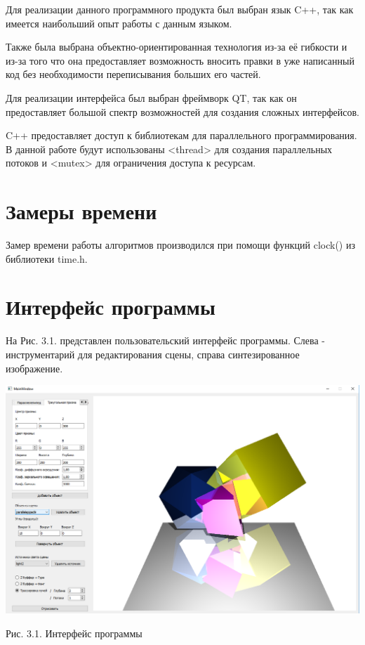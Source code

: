 \documentclass[12pt]{report}
\begin{document}
		Для реализации данного программного продукта был выбран язык C++, так как имеется наибольший опыт работы с данным языком.
		
		Также была выбрана объектно-ориентированная технология из-за её гибкости и из-за того что она предоставляет возможность вносить правки в уже написанный код без необходимости переписывания больших его частей.
		
		Для реализации интерфейса был выбран фреймворк QT, так как он предоставляет большой спектр возможностей для создания сложных интерфейсов.
		
		C++ предоставляет доступ к библиотекам для параллельного программирования. В данной работе будут использованы <thread> для создания параллельных потоков и <mutex> для ограничения доступа к ресурсам.
		
	\section{Замеры времени}
	Замер времени работы алгоритмов производился при помощи функций clock() из библиотеки time.h.
	
	\newpage
	\section{Интерфейс программы}
	
	На Рис. 3.1. представлен пользовательский интерфейс программы. Слева - инструментарий для редактирования сцены, справа синтезированное изображение.
	
	\begin{center}
		\includegraphics[scale=0.45]{UI.png}
		
		Рис. 3.1. Интерфейс программы
	\end{center}	
\end{document}
